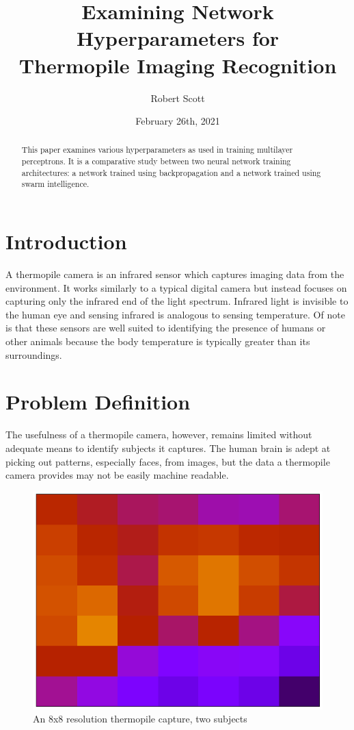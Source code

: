 \documentclass[a4paper,12pt]{article}
\title{Examining Network Hyperparameters for \\ Thermopile Imaging Recognition}
\author{Robert Scott}
\date{February 26th, 2021}
\begin{document}
\maketitle

\begin{abstract}
This paper examines various hyperparameters as used in training multilayer perceptrons. It is a comparative study between two neural network training architectures: a network trained using backpropagation and a network trained using swarm intelligence.
\end{abstract}

\section{Introduction}
A thermopile camera is an infrared sensor which captures imaging data from the environment. It works similarly to a typical digital camera but instead focuses on capturing only the infrared end of the light spectrum. Infrared light is invisible to the human eye and sensing infrared is analogous to sensing temperature. Of note is that these sensors are well suited to identifying the presence of humans or other animals because the body temperature is typically greater than its surroundings.

\section{Problem Definition}
The usefulness of a thermopile camera, however, remains limited without adequate means to identify subjects it captures. The human brain is adept at picking out patterns, especially faces, from images, but the data a thermopile camera provides may not be easily machine readable.

\begin{figure}[h!]
\centering
\includegraphics[scale=0.35]{images/heat1.png}
\caption{An 8x8 resolution thermopile capture, two subjects}
\label{fig:heatmap1}
\end{figure}
\end{document}
